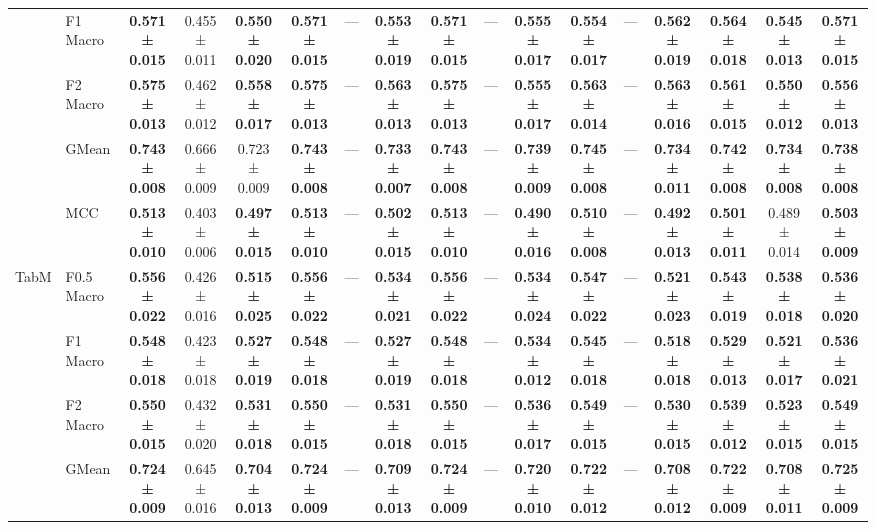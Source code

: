 \begin{table}[H]
{\begin{tabular}{llccccccccccccccc}
 & F1 Macro & \textbf{0.571 ± 0.015} & 0.455 ± 0.011 & \textbf{0.550 ± 0.020} & \textbf{0.571 ± 0.015} & — & \textbf{0.553 ± 0.019} & \textbf{0.571 ± 0.015} & — & \textbf{0.555 ± 0.017} & \textbf{0.554 ± 0.017} & — & \textbf{0.562 ± 0.019} & \textbf{0.564 ± 0.018} & \textbf{0.545 ± 0.013} & \textbf{0.571 ± 0.015} \\
 & F2 Macro & \textbf{0.575 ± 0.013} & 0.462 ± 0.012 & \textbf{0.558 ± 0.017} & \textbf{0.575 ± 0.013} & — & \textbf{0.563 ± 0.013} & \textbf{0.575 ± 0.013} & — & \textbf{0.555 ± 0.017} & \textbf{0.563 ± 0.014} & — & \textbf{0.563 ± 0.016} & \textbf{0.561 ± 0.015} & \textbf{0.550 ± 0.012} & \textbf{0.556 ± 0.013} \\
 & GMean & \textbf{0.743 ± 0.008} & 0.666 ± 0.009 & 0.723 ± 0.009 & \textbf{0.743 ± 0.008} & — & \textbf{0.733 ± 0.007} & \textbf{0.743 ± 0.008} & — & \textbf{0.739 ± 0.009} & \textbf{0.745 ± 0.008} & — & \textbf{0.734 ± 0.011} & \textbf{0.742 ± 0.008} & \textbf{0.734 ± 0.008} & \textbf{0.738 ± 0.008} \\
 & MCC & \textbf{0.513 ± 0.010} & 0.403 ± 0.006 & \textbf{0.497 ± 0.015} & \textbf{0.513 ± 0.010} & — & \textbf{0.502 ± 0.015} & \textbf{0.513 ± 0.010} & — & \textbf{0.490 ± 0.016} & \textbf{0.510 ± 0.008} & — & \textbf{0.492 ± 0.013} & \textbf{0.501 ± 0.011} & 0.489 ± 0.014 & \textbf{0.503 ± 0.009} \\
\cline{1-17}
\multirow[t]{5}{*}{TabM} & F0.5 Macro & \textbf{0.556 ± 0.022} & 0.426 ± 0.016 & \textbf{0.515 ± 0.025} & \textbf{0.556 ± 0.022} & — & \textbf{0.534 ± 0.021} & \textbf{0.556 ± 0.022} & — & \textbf{0.534 ± 0.024} & \textbf{0.547 ± 0.022} & — & \textbf{0.521 ± 0.023} & \textbf{0.543 ± 0.019} & \textbf{0.538 ± 0.018} & \textbf{0.536 ± 0.020} \\
 & F1 Macro & \textbf{0.548 ± 0.018} & 0.423 ± 0.018 & \textbf{0.527 ± 0.019} & \textbf{0.548 ± 0.018} & — & \textbf{0.527 ± 0.019} & \textbf{0.548 ± 0.018} & — & \textbf{0.534 ± 0.012} & \textbf{0.545 ± 0.018} & — & \textbf{0.518 ± 0.018} & \textbf{0.529 ± 0.013} & \textbf{0.521 ± 0.017} & \textbf{0.536 ± 0.021} \\
 & F2 Macro & \textbf{0.550 ± 0.015} & 0.432 ± 0.020 & \textbf{0.531 ± 0.018} & \textbf{0.550 ± 0.015} & — & \textbf{0.531 ± 0.018} & \textbf{0.550 ± 0.015} & — & \textbf{0.536 ± 0.017} & \textbf{0.549 ± 0.015} & — & \textbf{0.530 ± 0.015} & \textbf{0.539 ± 0.012} & \textbf{0.523 ± 0.015} & \textbf{0.549 ± 0.015} \\
 & GMean & \textbf{0.724 ± 0.009} & 0.645 ± 0.016 & \textbf{0.704 ± 0.013} & \textbf{0.724 ± 0.009} & — & \textbf{0.709 ± 0.013} & \textbf{0.724 ± 0.009} & — & \textbf{0.720 ± 0.010} & \textbf{0.722 ± 0.012} & — & \textbf{0.708 ± 0.012} & \textbf{0.722 ± 0.009} & \textbf{0.708 ± 0.011} & \textbf{0.725 ± 0.009} \\

\end{tabular}}
\end{table}
